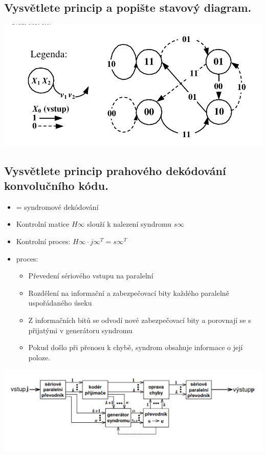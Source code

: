 \subsection{Vysvětlete princip a popište stavový diagram.}
\includegraphics[width=16cm]{images/8_stav.png}

\subsection{Vysvětlete princip prahového dekódování konvolučního kódu.}
\begin{itemize}
    \item = syndromové dekódování
    \item Kontrolní matice $H\infty$ slouží k nalezení syndromu $s\infty$
    \item Kontrolní proces: $H\infty\cdot j\infty^T=s\infty^T$
    \item proces:
    \begin{itemize}
        \item Převedení sériového vstupu na paralelní
        \item Rozdělení na informační a zabezpečovací bity každého paralelně uspořádaného úseku
        \item Z informačních bitů se odvodí nové zabezpečovací bity a porovnají se s přijatými v generátoru syndromu
        \item Pokud došlo při přenosu k chybě, syndrom obsahuje informace o její poloze.
    \end{itemize}
\end{itemize}
\includegraphics[width=16cm]{images/8_syndromove.png}

